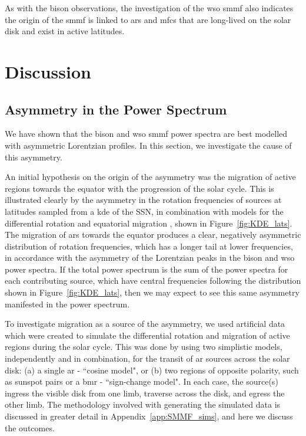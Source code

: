 As with the \gls{bison} observations, the investigation of the \gls{wso} \gls{smmf} also indicates the origin of the \gls{smmf} is linked to \glspl{ar} and \glspl{mfc} that are long-lived on the solar disk and exist in active latitudes.


\section{Discussion}\label{sec:SMMF_artificial}


\subsection{Asymmetry in the Power Spectrum}
\label{sec:asymmetry}

We have shown that the \gls{bison} and \gls{wso} \gls{smmf} power spectra are best modelled with asymmetric Lorentzian profiles. In this section, we investigate the cause of this asymmetry. 

An initial hypothesis on the origin of the asymmetry was the migration of active regions towards the equator with the progression of the solar cycle. This is illustrated clearly by the asymmetry in the rotation frequencies of sources at latitudes sampled from a \gls{kde} of the SSN, in combination with models for the differential rotation \citep{snodgrass_magnetic_1983} and equatorial migration \citep{li_latitude_2001}, shown in Figure~\ref{fig:KDE_lats}. The migration of \glspl{ar} towards the equator produces a clear, negatively asymmetric distribution of rotation frequencies, which has a longer tail at lower frequencies, in accordance with the asymmetry of the Lorentzian peaks in the \gls{bison} and \gls{wso} power spectra. If the total power spectrum is the sum of the power spectra for each contributing source, which have central frequencies following the distribution shown in Figure~\ref{fig:KDE_lats}, then we may expect to see this same asymmetry manifested in the power spectrum.

To investigate migration as a source of the asymmetry, we used artificial data which were created to simulate the differential rotation and migration of active regions during the solar cycle. This was done by using two simplistic models, independently and in combination, for the transit of \gls{ar} sources across the solar disk: (a) a single \gls{ar} - ``cosine model", or (b) two regions of opposite polarity, such as sunspot pairs or a \gls{bmr} - ``sign-change model". In each case, the source(s) ingress the visible disk from one limb, traverse across the disk, and egress the other limb. The methodology involved with generating the simulated data is discussed in greater detail in Appendix~\ref{app:SMMF_sims}, and here we discuss the outcomes.


